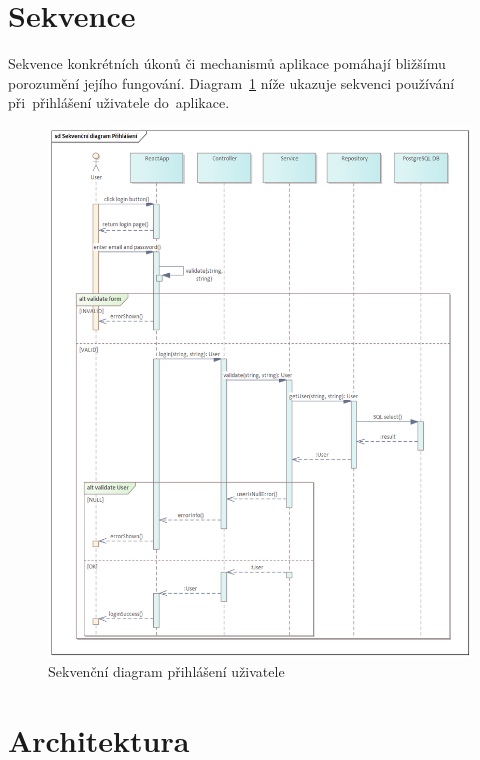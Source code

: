 \documentclass[twoside]{ctuthesis}
\begin{document}
\newpage

\section{Sekvence}
\label{sec:fivethree}

Sekvence konkrétních úkonů či mechanismů aplikace pomáhají bližšímu porozumění jejího fungování. Diagram~\ref{fig:sd} níže ukazuje sekvenci používání při~přihlášení uživatele do~aplikace.

\begin{figure}[H]
\centering
\includegraphics[width=1.17\textwidth, height=0.83\textheight]{Sekvenční diagram Přihlášení.png}
\caption{Sekvenční diagram přihlášení uživatele}
\label{fig:sd}
\end{figure}

\newpage

\section{Architektura}
\end{document}

